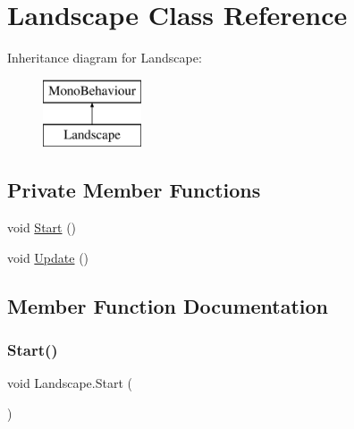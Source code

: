 \hypertarget{class_landscape}{}\section{Landscape Class Reference}
\label{class_landscape}
Inheritance diagram for Landscape\+:\begin{figure}[H]
\begin{center}
\leavevmode
\includegraphics[height=2.000000cm]{class_landscape}
\end{center}
\end{figure}
\subsection*{Private Member Functions}
\begin{DoxyCompactItemize}
\item 
void \hyperlink{class_landscape_ad60d989f987193736801f9d3b0ffd126}{Start} ()
\item 
void \hyperlink{class_landscape_a2c6abdd5528abe96365f1abe0b0c394f}{Update} ()
\end{DoxyCompactItemize}


\subsection{Member Function Documentation}
\mbox{\label{class_landscape_ad60d989f987193736801f9d3b0ffd126}} 
\subsubsection{\texorpdfstring{Start()}{Start()}}
{\footnotesize\ttfamily void Landscape.\+Start (\begin{DoxyParamCaption}{ }\end{DoxyParamCaption})\hspace{0.3cm}{\ttfamily [private]}}

\mbox{\label{class_landscape_a2c6abdd5528abe96365f1abe0b0c394f}} 
